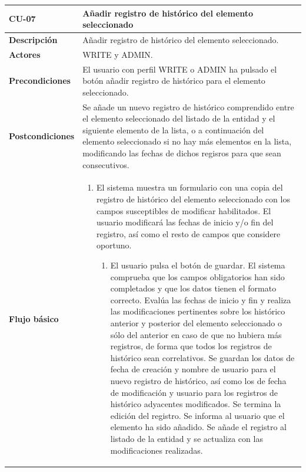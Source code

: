 \begin{table} [H]
    \centering
    \setlength{\leftmargini}{0.4cm}
	\resizebox{15cm}{!} { %
    \begin{tabular}{| m{3cm} | m{12cm} |}   
    \hline
	  \textbf{CU-07} & \textbf{Añadir registro de histórico del elemento seleccionado} \\\hline
	  \textbf{Descripción} & Añadir registro de histórico del elemento seleccionado. \\\hline
	  \textbf{Actores} & WRITE y ADMIN. \\\hline
	  \textbf{Precondiciones} & El usuario con perfil WRITE o ADMIN ha pulsado el botón añadir registro de histórico para el elemento seleccionado. \\\hline
	  \textbf{Postcondiciones} & Se añade un nuevo registro de histórico  comprendido entre el elemento seleccionado del listado de la entidad y el siguiente elemento de la lista, o a continuación del elemento seleccionado si no hay más elementos en la lista, modificando las fechas de dichos regisros para que sean consecutivos. \\\hline
	  \textbf{Flujo básico} & 
		\begin{enumerate}
	  	\item El sistema muestra un formulario con una copia del registro de histórico del elemento seleccionado con los campos susceptibles de modificar habilitados. El usuario modificará las fechas de inicio y/o fin del registro, así como el resto de campos que considere oportuno. 
			\begin{enumerate}	
			   \item El usuario pulsa el botón de guardar. El sistema comprueba que los campos obligatorios han sido completados y que los datos tienen el formato correcto. Evalúa las fechas de inicio y fin y realiza las modificaciones pertinentes sobre los histórico anterior y posterior del elemento seleccionado o sólo del anterior en caso de que no hubiera más registros, de forma que todos los registros de histórico sean correlativos. Se guardan los datos de fecha de creación y nombre de usuario para el nuevo registro de histórico, así como los de fecha de modificación y usuario para los registros de histórico adyacentes modificados. Se termina la edición del registro. Se informa al usuario que el elemento ha sido añadido. Se añade el registro al listado de la entidad y se actualiza con las modificaciones realizadas.

\end{enumerate}
\end{enumerate}
\end{tabular}}
\end{table}
